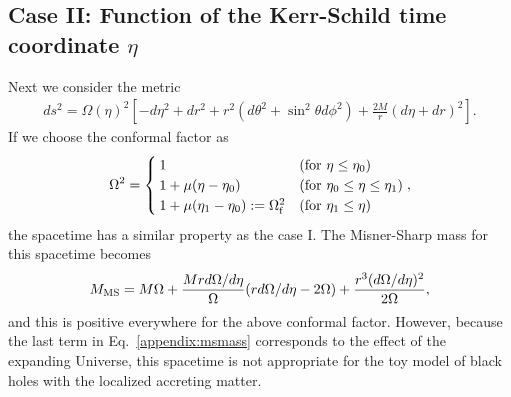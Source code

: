 \documentclass[prd,showpacs,preprintnumbers,groupedaddress,superscriptaddress,nofootinbib,11pt]{revtex4-1} %
\theoremstyle{newplain}
\begin{document}
\subsection{Case II: Function of the Kerr-Schild time coordinate $\eta$}
Next we consider the metric
\begin{align}
ds^2 = \Omega(\eta)^2\left[
-d\eta^2 + dr^2 +r^2(d\theta^2 + \sin^2\theta d\phi^2)
+
\frac{2M}{r}(d\eta + dr)^2
\right].
\end{align}
If we choose the conformal factor as
\begin{align}
\Omega^2 = 
\begin{cases}
  1 &({\rm for}~\eta \le \eta_0)
\\ 
  1 + \mu (\eta - \eta_0) &({\rm for}~\eta_0 \le \eta \le \eta_1)
\\ 
  1 + \mu (\eta_1 - \eta_0) := \Omega_{\rm f}^2 & ({\rm for}~\eta_1 \le \eta)
\end{cases},
\end{align}
the spacetime has a similar property as the case I.
The Misner-Sharp mass for this spacetime becomes
\begin{align}
M_{\rm MS} = M \Omega + \frac{M r d\Omega/d\eta}{\Omega}(r d\Omega/d\eta - 2 \Omega) + \frac{r^3(d\Omega/d\eta)^2}{2\Omega},
\label{appendix:msmass}
\end{align}
and this is positive everywhere for the above conformal factor.
However, because the last term in Eq.~\eqref{appendix:msmass} 
corresponds to the effect of the expanding Universe,
this spacetime is not appropriate for the toy model of black holes with the localized accreting matter.


\afterpage{\clearpage}
\newpage

\end{document}
